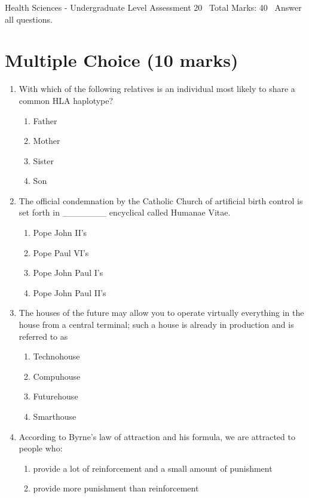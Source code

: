 \documentclass[12pt]{article}
\begin{document}
\begin{center}
Health Sciences - Undergraduate Level Assessment 20 \
Total Marks: 40 \
Answer all questions.
\end{center}

\section*{Multiple Choice (10 marks)}
\begin{enumerate}[label=\arabic*.]
\item With which of the following relatives is an individual most likely to share a common HLA haplotype?
\begin{enumerate}[label=(\alph*)]
    \item Father
    \item Mother
    \item Sister
    \item Son
\end{enumerate}
\item The official condemnation by the Catholic Church of artificial birth control is set forth in \_\_\_\_\_\_\_ encyclical called Humanae Vitae.
\begin{enumerate}[label=(\alph*)]
    \item Pope John II's
    \item Pope Paul VI's
    \item Pope John Paul I's
    \item Pope John Paul II's
\end{enumerate}
\item The houses of the future may allow you to operate virtually everything in the house from a central terminal; such a house is already in production and is referred to as
\begin{enumerate}[label=(\alph*)]
    \item Technohouse
    \item Compuhouse
    \item Futurehouse
    \item Smarthouse
\end{enumerate}
\item According to Byrne's law of attraction and his formula, we are attracted to people who:
\begin{enumerate}[label=(\alph*)]
    \item provide a lot of reinforcement and a small amount of punishment
    \item provide more punishment than reinforcement

\end{enumerate}
\end{enumerate}
\end{document}
